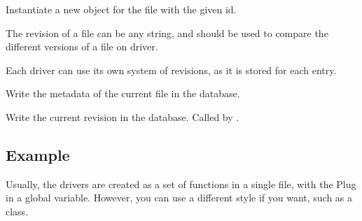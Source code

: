 \documentclass[letterpaper,10pt,english]{sphinxmanual}
\begin{document}
\begin{fulllineitems}
\begin{fulllineitems}
\end{fulllineitems}


\begin{fulllineitems}
\label{drivers:onitu.api.metadata.Metadata.get_by_id}
Instantiate a new {\hyperref[drivers:onitu.api.metadata.Metadata]{}} object for the file
with the given id.

\end{fulllineitems}


\begin{fulllineitems}
\label{drivers:onitu.api.metadata.Metadata.revision}
The revision of a file can be any string, and should be
used to compare the different versions of a file on driver.

Each driver can use its own system of revisions, as it is
stored for each entry.

\end{fulllineitems}


\begin{fulllineitems}
\label{drivers:onitu.api.metadata.Metadata.write}
Write the metadata of the current file in the database.

\end{fulllineitems}


\begin{fulllineitems}
\label{drivers:onitu.api.metadata.Metadata.write_revision}
Write the current revision in the database. Called
by {\hyperref[drivers:onitu.api.metadata.Metadata.write]{}}.

\end{fulllineitems}


\end{fulllineitems}



\subsection{Example}
\label{drivers:example}
Usually, the drivers are created as a set of functions in a single file, with the Plug in a global variable. However, you can use a different style if you want, such as a class.
\end{document}
